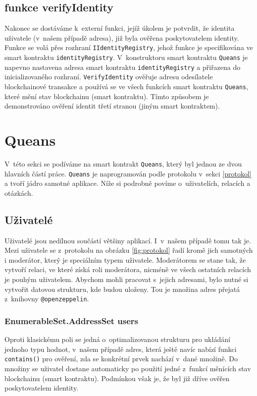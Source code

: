 \subsection{funkce verifyIdentity}
Nakonec se dostáváme k~externí funkci, jejíž úkolem je potvrdit, že identita uživatele (v~našem případě adresa), již byla ověřena poskytovatelem identity. Funkce se volá přes rozhraní \texttt{IIdentityRegistry}, jehož funkce je specifikována ve smart kontraktu \texttt{identityRegistry}. V~konstruktoru smart kontraktu \texttt{Queans} je napevno nastavena adresa smart kontraktu \texttt{identityRegistry} a přiřazena do inicializovaného rozhraní. \texttt{VerifyIdentity} ověřuje adresu odesílatele blockchainové transakce a používá se ve všech funkcích smart kontraktu \texttt{Queans}, které mění stav blockchainu (smart kontraktu). Tímto způsobem je demonstrováno ověření identit třetí stranou (jiným smart kontraktem).
\section{Queans}
\label{queans}
V~této sekci se podíváme na smart kontrakt \texttt{Queans}, který byl jednou ze dvou hlavních částí práce. \texttt{Queans} je naprogramován podle protokolu v~sekci \ref{protokol} a tvoří jádro samotné aplikace. Níže si podrobně povíme o~uživatelích, relacích a otázkách.

\subsection{Uživatelé}
Uživatelé jsou nedílnou součástí většiny aplikací. I~v~našem případě tomu tak je. Mezi uživatele se z~protokolu na obrázku \ref{fig:protokol} řadí kromě jich samotných i moderátor, který je speciálním typem uživatele. Moderátorem se stane tak, že vytvoří relaci, ve které získá roli moderátora, nicméně ve všech ostatních relacích je pouhým uživatelem. Abychom mohli pracovat s~jejich adresami, bylo nutné si vytvořit datovou strukturu, kde budou uloženy. Tou je množina adres přejatá z~knihovny \texttt{@openzeppelin}. 
\subsubsection{EnumerableSet.AddressSet users}

Oproti klasickému poli se jedná o~optimalizovanou strukturu pro ukládání jednoho typu hodnot, v~našem případě adres, která ještě navíc nabízí funkci \texttt{contains()} pro ověření, zda se konkrétní prvek nachází v~dané množině. Do množiny se uživatel dostane automaticky po použití jedné z~funkcí měnících stav blockchainu (smart kontraktu). Podmínkou však je, že byl již dříve ověřen poskytovatelem identity. 

